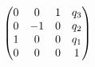 $$\ifx\endpmatrix\undefined\pmatrix{\else\begin{pmatrix}\fi 0&0&1&
 q_{3}\cr 0&-1&0&q_{2}\cr 1&0&0&q_{1}\cr 0&0&0&1\cr 
 \ifx\endpmatrix\undefined}\else\end{pmatrix}\fi $$

